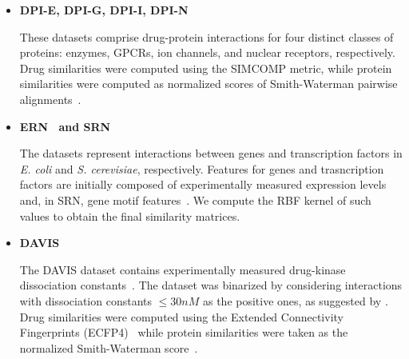 \begin{itemize}
    \item \textbf{DPI-E, DPI-G, DPI-I, DPI-N~\cite{yamanishi2008prediction}}

    These datasets comprise drug-protein interactions for four distinct classes of proteins: enzymes, GPCRs, ion channels, and nuclear receptors, respectively. Drug similarities were computed using the SIMCOMP metric, while protein similarities were computed as normalized scores of Smith-Waterman pairwise alignments~\cite{yamanishi2008prediction}.

    \item \textbf{ERN~\cite{faith2007largescale} and SRN~\cite{macisaac2006improved, hughes2000functional, hu2007genetic, chua2006identifying, schrynemackers2015classifying}}

    The datasets represent interactions between genes and transcription factors in \textit{E. coli} and \textit{S. cerevisiae}, respectively. Features for genes and trasncription factors are initially composed of experimentally measured expression levels and, in SRN, gene motif features~\cite{brohee2011unraveling,schrynemackers2015classifying}. We compute the RBF kernel of such values to obtain the final similarity matrices. %

    \item \textbf{DAVIS~\cite{davis2011comprehensive,pahikkala2015more}}

    The DAVIS dataset contains experimentally measured drug-kinase dissociation constants~\cite{davis2011comprehensive}. The dataset was binarized by considering interactions with dissociation constants $\le 30 nM$ as the positive ones, as suggested by \cite{pahikkala2015more}. Drug similarities were computed using the Extended Connectivity Fingerprints (ECFP4)~\cite{rogers2005using,pahikkala2015more} while protein similarities were taken as the normalized Smith-Waterman score~\cite{yamanishi2008prediction,pahikkala2015more}.


\end{itemize}
